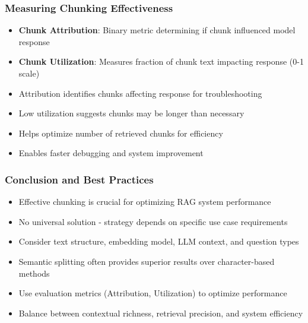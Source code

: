 \begin{frame}[fragile]\frametitle{Measuring Chunking Effectiveness}
      \begin{itemize}
\item \textbf{Chunk Attribution}: Binary metric determining if chunk influenced model response
\item \textbf{Chunk Utilization}: Measures fraction of chunk text impacting response (0-1 scale)
\item Attribution identifies chunks affecting response for troubleshooting
\item Low utilization suggests chunks may be longer than necessary
\item Helps optimize number of retrieved chunks for efficiency
\item Enables faster debugging and system improvement
  \end{itemize}
\end{frame}

\begin{frame}[fragile]\frametitle{Conclusion and Best Practices}
      \begin{itemize}
\item Effective chunking is crucial for optimizing RAG system performance
\item No universal solution - strategy depends on specific use case requirements
\item Consider text structure, embedding model, LLM context, and question types
\item Semantic splitting often provides superior results over character-based methods
\item Use evaluation metrics (Attribution, Utilization) to optimize performance
\item Balance between contextual richness, retrieval precision, and system efficiency
  \end{itemize}
\end{frame}